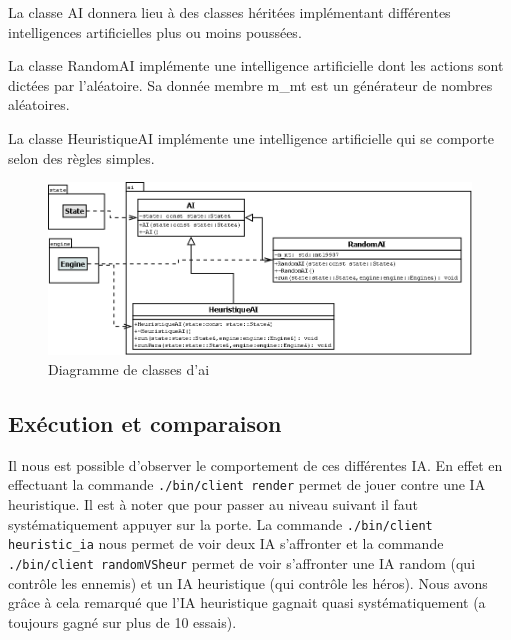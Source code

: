 \documentclass[a4paper,12pt]{article}
\begin{document}
La classe AI donnera lieu à des classes héritées implémentant différentes intelligences artificielles plus ou moins poussées.

La classe RandomAI implémente une intelligence artificielle dont les actions sont dictées par l'aléatoire. Sa donnée membre m\_mt est un générateur de nombres aléatoires.

La classe HeuristiqueAI implémente une intelligence artificielle qui se comporte selon des règles simples.

\begin{figure}[hbt!]
    \centering
    \includegraphics[width =.8\paperwidth, angle=0]{images/ai.png}
    \caption{Diagramme de classes d'ai}
    \label{fig:randomai}
\end{figure}

\subsection{Exécution et comparaison}
Il nous est possible d'observer le comportement de ces différentes IA. En effet en effectuant la commande \texttt{./bin/client render} permet de jouer contre une IA heuristique. Il est à noter que pour passer au niveau suivant il faut systématiquement appuyer sur la porte. La commande \texttt{./bin/client heuristic\_ia} nous permet de voir deux IA s'affronter et la commande \texttt{./bin/client randomVSheur} permet de voir s'affronter une IA random (qui contrôle les ennemis) et un IA heuristique (qui contrôle les héros). Nous avons grâce à cela remarqué que l'IA heuristique gagnait quasi systématiquement (a toujours gagné sur plus de 10 essais). 

\end{document}
